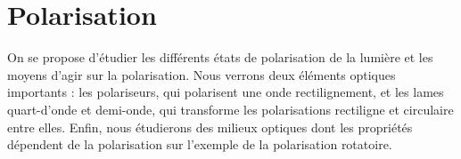 % 
%

%

\section{Polarisation}

On se propose  d'étudier les différents états de polarisation de la lumière et les moyens d'agir sur la polarisation. Nous verrons deux éléments optiques importants : les polariseurs, qui polarisent une onde rectilignement, et les lames quart-d'onde et demi-onde, qui transforme les polarisations rectiligne et circulaire entre elles. Enfin, nous étudierons des milieux optiques dont les propriétés dépendent de la polarisation sur l'exemple de la polarisation rotatoire.

